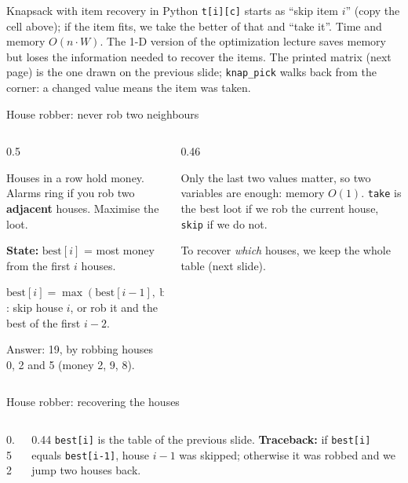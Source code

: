 \documentclass[aspectratio=169,10pt]{beamer}
\newcommand{\figtab}[2][0.5]{\begin{sfig}[#1]\end{sfig}}
\begin{document}
\begin{frame}[allowframebreaks]{Knapsack with item recovery in Python}
\vspace{2mm}
{\small
\texttt{t[i][c]} starts as ``skip item $i$'' (copy the cell above); if the item fits, we take the better of that and ``take it''. Time and memory $O(n\cdot W)$. The 1-D version of the optimization lecture saves memory but loses the information needed to recover the items. The printed matrix (next page) is the one drawn on the previous slide; \texttt{knap\_pick} walks back from the corner: a changed value means the item was taken.}
\framebreak
{}
\vspace{2mm}
\end{frame}

\begin{frame}{House robber: never rob two neighbours}
\begin{columns}[T]
\begin{column}{0.5\textwidth}
\figtab[0.3]{fig_rob}
\vspace{1mm}
{\small
Houses in a row hold money. Alarms ring if you rob two \textbf{adjacent} houses. Maximise the loot.

\vspace{1mm}
\textbf{State:} $\mathrm{best}[i]$ = most money from the first $i$ houses.

\vspace{1mm}
$\mathrm{best}[i]=\max(\mathrm{best}[i-1],\ \mathrm{best}[i-2]+m_i)$: skip house $i$, or rob it and the best of the first $i-2$.

\vspace{1mm}
Answer: 19, by robbing houses 0, 2 and 5 (money 2, 9, 8).}
\end{column}
\begin{column}{0.46\textwidth}
\vspace{2mm}
{\small
Only the last two values matter, so two variables are enough: memory $O(1)$. \texttt{take} is the best loot if we rob the current house, \texttt{skip} if we do not.

\vspace{1mm}
To recover \emph{which} houses, we keep the whole table (next slide).}
\end{column}
\end{columns}
\end{frame}

\begin{frame}{House robber: recovering the houses}
\begin{columns}[T]
\begin{column}{0.52\textwidth}
\pycode[\fontsize{7.8}{9.2}\selectfont]{rob_plan}
\end{column}
\begin{column}{0.44\textwidth}
\vspace{2mm}
{\small
\texttt{best[i]} is the table of the previous slide. \textbf{Traceback:} if \texttt{best[i]} equals \texttt{best[i-1]}, house $i-1$ was skipped; otherwise it was robbed and we jump two houses back.}
\end{column}
\end{columns}
\end{frame}
\end{document}
